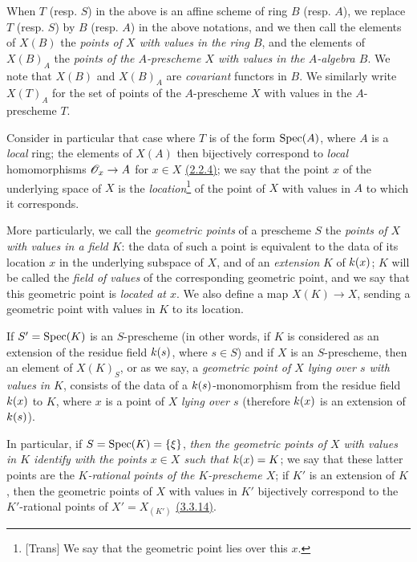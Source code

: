 \begin{env}[3.4.4]
\label{env-1.3.4.4}
When $T$ (resp. $S$) in the above is an affine scheme of ring $B$ (resp. $A$), we replace
$T$ (resp. $S$) by $B$ (resp. $A$) in the above notations, and we then call the elements of
$X(B)$ the {\em points of $X$ with values in the ring $B$}, and the elements of $X(B)_A$ the
{\em points of the $A$-prescheme $X$ with values in the $A$-algebra $B$}. We note that
$X(B)$ and $X(B)_A$ are {\em covariant} functors in $B$. We similarly write $X(T)_A$ for the
set of points of the $A$-prescheme $X$ with values in the $A$-prescheme $T$.
\end{env}

\begin{env}[3.4.5]
\label{env-1.3.4.5}
Consider in particular that case where $T$ is of the form ${\mathop{\mathrm{Spec}}\nolimits}(A)$, where $A$ is a
{\em local} ring; the elements of $X(A)$ then bijectively correspond to {\em local}
homomorphisms $\mathscr{O}_x\to A$ for $x\in X$ \hyperref[prop-1.2.2.4]{(2.2.4)}; we say that the
point $x$ of the underlying space of $X$ is the {\em location}\footnote{[Trans] We say that
the geometric point lies over this $x$.} of the point of $X$ with values in $A$ to which it
corresponds.

More particularly, we call the {\em geometric points} of a prescheme $S$ the {\em points of
$X$ with values in a field $K$}: the data of such a point is equivalent to the data of its
location $x$ in the underlying subspace of $X$, and of an {\em extension} $K$ of $k(x)$;
$K$ will be called the {\em field of values} of the corresponding geometric point, and we
say that this geometric point is {\em located at $x$}. We also define a map $X(K)\to X$,
sending a geometric point with values in $K$ to its location.

If $S'={\mathop{\mathrm{Spec}}\nolimits}(K)$ is an $S$-prescheme (in other words, if $K$ is considered as an extension
of the residue field $k(s)$, where $s\in S$) and if $X$ is an $S$-prescheme, then an
element of $X(K)_S$, or as we say, a {\em geometric point of $X$ lying over $s$ with values
in $K$}, consists of the data of a $k(s)$-monomorphism from the residue field $k(x)$
to $K$, where $x$ is a point of $X$ {\em lying over $s$} (therefore $k(x)$ is an
extension of $k(s)$).

In particular, if $S={\mathop{\mathrm{Spec}}\nolimits}(K)=\{\xi\}$, {\em then the geometric points of $X$ with values in
$K$ identify with the points $x\in X$ such that $k(x)=K$}; we say that these latter
points are the {\em $K$-rational points of the $K$-prescheme $X$}; if $K'$ is an extension
of $K$, then the geometric points of $X$ with values in $K'$ bijectively correspond to the
$K'$-rational points of $X'=X_{(K')}$ \hyperref[env-1.3.3.14]{(3.3.14)}.
\end{env}

